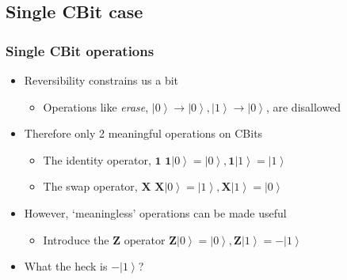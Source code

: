 \documentclass{beamer}
\newcommand{\ket}[1]{\left|{#1}\right\rangle}
\newcommand{\iop}{\textbf{1}}
\newcommand{\xop}{\textbf{X}}
\newcommand{\zop}{\textbf{Z}}
\newcommand{\zvec}{\ket{0}}
\newcommand{\ovec}{\ket{1}}
\begin{document}
  \subsection{Single CBit case}
  \begin{frame}
    \frametitle{Single CBit operations}
    \begin{itemize}
      \item{Reversibility constrains us a bit}
      \begin{itemize}
        \item{Operations like \textit{erase}, $\zvec \rightarrow \zvec, \ovec \rightarrow \zvec$, are disallowed}
      \end{itemize}
      \item{Therefore only 2 meaningful operations on CBits}
      \begin{itemize}
        \item{The identity operator, $\iop$} \linebreak
        $\iop\zvec = \zvec, \iop\ovec = \ovec$
        \item{The swap operator, $\xop$} \linebreak
        $\xop\zvec = \ovec, \xop\ovec = \zvec$
      \end{itemize}
      \item{However, `meaningless' operations can be made useful}
      \begin{itemize}
        \item{Introduce the $\zop$ operator} \linebreak
        $\zop\zvec = \zvec, \zop\ovec = -\ovec$
      \end{itemize}
      \item{What the heck is $-\ovec$?}
    \end{itemize}
  \end{frame}

\end{document}

